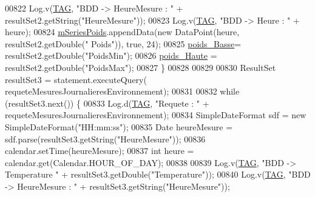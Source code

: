 \begin{DoxyCode}
00822                             Log.v(\hyperlink{classfr_1_1campus_1_1laurainc_1_1honeybee_1_1_ruche_a44739cbb0fa7451c1edc240a3f51c257}{TAG}, \textcolor{stringliteral}{"BDD -> HeureMesure : "} + resultSet2.getString(\textcolor{stringliteral}{"HeureMesure"}));
00823                             Log.v(\hyperlink{classfr_1_1campus_1_1laurainc_1_1honeybee_1_1_ruche_a44739cbb0fa7451c1edc240a3f51c257}{TAG}, \textcolor{stringliteral}{"BDD -> Heure : "} + heure);
00824                             \hyperlink{classfr_1_1campus_1_1laurainc_1_1honeybee_1_1_ruche_ac181c5f8d7cc950c4f015d8abccf44d8}{mSeriesPoids}.appendData(\textcolor{keyword}{new} DataPoint(heure, resultSet2.getDouble(\textcolor{stringliteral}{"
      Poids"})), \textcolor{keyword}{true}, 24);
00825                             \hyperlink{classfr_1_1campus_1_1laurainc_1_1honeybee_1_1_ruche_ae321c3f7e1f6df6ee69dae4eac5eff1b}{poids\_Basse}= resultSet2.getDouble(\textcolor{stringliteral}{"PoidsMin"});
00826                             \hyperlink{classfr_1_1campus_1_1laurainc_1_1honeybee_1_1_ruche_a9bfa63b9e5d815d16e07231065f8f31e}{poids\_Haute} = resultSet2.getDouble(\textcolor{stringliteral}{"PoidsMax"});
00827                         \}
00828 
00829 
00830                         ResultSet resultSet3 = statement.executeQuery(
      requeteMesuresJournalieresEnvironnement);
00831 
00832                         \textcolor{keywordflow}{while} (resultSet3.next()) \{
00833                             Log.d(\hyperlink{classfr_1_1campus_1_1laurainc_1_1honeybee_1_1_ruche_a44739cbb0fa7451c1edc240a3f51c257}{TAG}, \textcolor{stringliteral}{"Requete : "} + requeteMesuresJournalieresEnvironnement);
00834                             SimpleDateFormat sdf = \textcolor{keyword}{new} SimpleDateFormat(\textcolor{stringliteral}{"HH:mm:ss"});
00835                             Date heureMesure = sdf.parse(resultSet3.getString(\textcolor{stringliteral}{"HeureMesure"}));
00836                             calendar.setTime(heureMesure);
00837                             \textcolor{keywordtype}{int} heure = calendar.get(Calendar.HOUR\_OF\_DAY);
00838 
00839                             Log.v(\hyperlink{classfr_1_1campus_1_1laurainc_1_1honeybee_1_1_ruche_a44739cbb0fa7451c1edc240a3f51c257}{TAG}, \textcolor{stringliteral}{"BDD -> Temperature "} + resultSet3.getDouble(\textcolor{stringliteral}{"Temperature"}));
00840                             Log.v(\hyperlink{classfr_1_1campus_1_1laurainc_1_1honeybee_1_1_ruche_a44739cbb0fa7451c1edc240a3f51c257}{TAG}, \textcolor{stringliteral}{"BDD -> HeureMesure : "} + resultSet3.getString(\textcolor{stringliteral}{"HeureMesure"}));

\end{DoxyCode}

